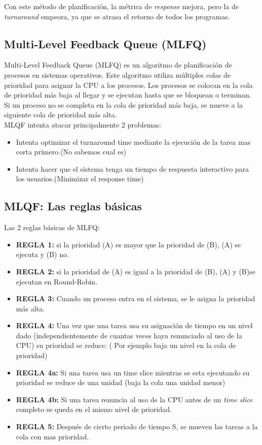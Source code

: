 \documentclass[../main.tex]{subfiles}
\begin{document}
            Con este método de planificación, la métrica de \textit{response} mejora, pero la de \textit{turnaround} empeora, ya que se atrasa el retorno de todos los programas.

    \subsection{Multi-Level Feedback Queue (MLFQ)}
        Multi-Level Feedback Queue (MLFQ) es un algoritmo de planificación de procesos en sistemas operativos. Este algoritmo utiliza múltiples colas de prioridad para asignar la CPU a los procesos. Los procesos se colocan en la cola de prioridad más baja al llegar y se ejecutan hasta que se bloquean o terminan. Si un proceso no se completa en la cola de prioridad más baja, se mueve a la siguiente cola de prioridad más alta.\\

        MLQF intenta atacar principalmente 2 problemas:
        \begin{itemize}
            \item Intenta optimizar el turnaround time mediante la ejecución de la tarea mas corta primero.(No sabemos cual es)
            \item Intenta hacer que el sistema tenga un tiempo de respuesta interactivo para los usuarios.(Minimizar el response time)
        \end{itemize}

    \subsection{MLQF: Las reglas básicas}
        Las 2 reglas básicas de MLFQ:
        \begin{itemize}
            \item \textbf{REGLA 1:} si la prioridad (A) es mayor que la prioridad de (B), (A) se ejecuta y (B) no.
            \item \textbf{REGLA 2:} si la prioridad de (A) es igual a la prioridad de (B), (A) y (B)se ejecutan en Round-Robin.
            \item \textbf{REGLA 3:} Cuando un proceso entra en el sistema, se le asigna la prioridad más alta.
            \item \textbf{REGLA 4:} Una vez que una tarea usa su asignación de tiempo en un nivel dado (independientemente de cuantas veces haya renunciado al uso de la CPU) su prioridad se reduce: ( Por ejemplo baja un nivel en la cola de prioridad)
            \item \textbf{REGLA 4a:} Si una tarea usa un time slice mientras se esta ejecutando su prioridad se reduce de una unidad (baja la cola una unidad menor)
            \item \textbf{REGLA 4b:} Si una tarea renuncia al uso de la CPU antes de un \textit{time slice} completo se queda en el mismo nivel de prioridad.
            \item \textbf{REGLA 5:} Después de cierto periodo de tiempo S, se mueven las tareas a la cola con mas prioridad.
        \end{itemize}
\end{document}
